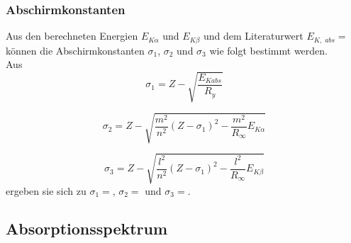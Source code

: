 \subsubsection*{Abschirmkonstanten}

Aus den berechneten Energien $E_{K \alpha}$ und $E_{K \beta}$ und dem Literaturwert $E_{K,\;abs} = $ können die Abschirmkonstanten $\sigma_1$, $\sigma_2$ 
und $\sigma_3$ wie folgt bestimmt werden. \\
Aus 
\begin{equation*}
  \sigma_1=Z-\sqrt{\frac{E_{Kabs}}{R_y}}
  \end{equation*}
  
  \begin{equation*}
  \sigma_2=Z-\sqrt{ \frac{m^2}{n^2}(Z-\sigma_1)^2 - \frac{m^2}{R_\infty} E_{K\alpha}}
  \end{equation*}
  
  \begin{equation*}
      \sigma_3=Z-\sqrt{ \frac{l^2}{n^2}(Z-\sigma_1)^2 - \frac{l^2}{R_\infty} E_{K\beta}}
  \end{equation*}
ergeben sie sich zu $\sigma_1 = $, $\sigma_2 = $ 
und $\sigma_3 = $.

\subsection{Absorptionsspektrum}
\label{subsec:absorptionsspektrum}









%
